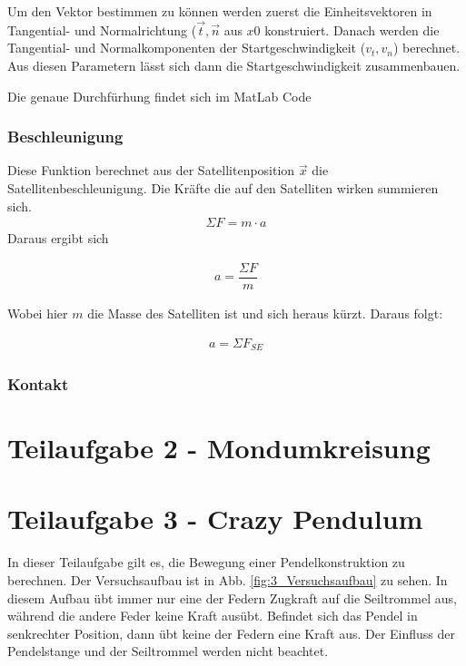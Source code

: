 \documentclass[]{scrartcl}
\begin{document}
Um den Vektor bestimmen zu können werden zuerst die Einheitsvektoren in Tangential- und Normalrichtung ($\vec{t}, \vec{n}$ aus $x0$ konstruiert. Danach werden die Tangential- und Normalkomponenten der Startgeschwindigkeit ($v_t , v_n$) berechnet. Aus diesen Parametern lässt sich dann die Startgeschwindigkeit zusammenbauen.

Die genaue Durchfürhung findet sich im MatLab Code

\subsubsection{Beschleunigung}
Diese Funktion berechnet aus der Satellitenposition $\vec{x}$ die Satellitenbeschleunigung.
Die Kräfte die auf den Satelliten wirken summieren sich. 
\begin{align}
\Sigma{F} = m \cdot a
\end{align}
Daraus ergibt sich 

\begin{align}
a = \dfrac{\Sigma{F}}{m}
\end{align}

Wobei hier $m$ die Masse des Satelliten ist und sich heraus kürzt. Daraus folgt:

\begin{align}
a = \Sigma{F}_{SE}
\end{align}



\subsubsection{Kontakt}


\section{Teilaufgabe 2 - Mondumkreisung}

\section{Teilaufgabe 3 - Crazy Pendulum}
In dieser Teilaufgabe gilt es, die Bewegung einer Pendelkonstruktion zu berechnen. Der Versuchsaufbau ist in Abb. \ref{fig:3_Versuchsaufbau} zu sehen. In diesem Aufbau übt immer nur eine der Federn Zugkraft auf die Seiltrommel aus, während die andere Feder keine Kraft ausübt. Befindet sich das Pendel in senkrechter Position, dann übt keine der Federn eine Kraft aus. Der Einfluss der Pendelstange und der Seiltrommel werden nicht beachtet.
\end{document}
